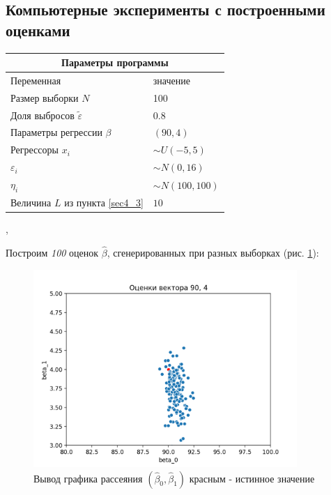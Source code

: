 \documentclass[a4paper,14pt]{extarticle}
\begin{document}
\subsection{Компьютерные эксперименты с построенными оценками}
\begin{center}
    \begin{tabular}{|p{5cm}|p{5cm}|}
        \hline
        \multicolumn{2}{|c|}{Параметры программы} \\
        \hline
        Переменная&значение\\
        \hline
        Размер выборки $N$& 100\\
        \hline
        Доля выбросов $\widetilde{\varepsilon}$& 0.8\\
        \hline
        Параметры регрессии $\beta$& $(90,4)$\\
        \hline
        Регрессоры $x_i$ & $\sim U(-5,5)$\\
        \hline
        $\varepsilon_i$&$\sim N(0,16)$\\
        \hline
        $\eta_i$&$\sim N(100,100)$\\
        \hline
        Величина $L$ из пункта \ref{sec4_3}&$10$\\
        \hline
    \end{tabular},
    \end{center}

Построим \textit{100} оценок $\hat{\beta}$, сгенерированных при разных выборках (рис. \ref{pic2}):

\newpage
\begin{figure}[ht!]
    \centering
    \includegraphics[width=100mm]{pics/plot_90_4_(2).png}
    \caption{Вывод графика рассеяния $(\hat{\beta}_0,\hat{\beta}_1)$ красным - истинное значение\label{overflow}}
    \label{pic2}
\end{figure}
\hfill\break
\end{document}
